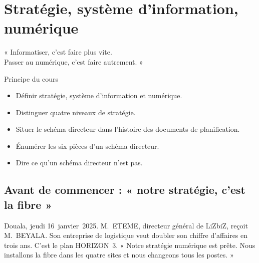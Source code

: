 
\chapter{Stratégie, système d'information, numérique}
\label{chap:vocabulaire}

\epigraph{%
    « Informatiser, c'est faire plus vite.\\
    Passer au numérique, c'est faire autrement. »%
}{Principe du cours}


\begin{boxobjectifs}
\begin{itemize}
    \item Définir stratégie, système d'information et numérique.
    \item Distinguer quatre niveaux de stratégie.
    \item Situer le schéma directeur dans l'histoire des documents de planification.
    \item Énumérer les six pièces d'un schéma directeur.
    \item Dire ce qu'un schéma directeur n'est pas.
\end{itemize}
\end{boxobjectifs}

\bigskip

\section*{Avant de commencer : « notre stratégie, c'est la fibre »}

Douala, jeudi 16~janvier~2025. M.~ETEME, directeur général de LiZbiZ, reçoit M.~BEYALA. Son entreprise de
logistique veut doubler son chiffre d'affaires en trois ans. C'est le plan HORIZON~3. « Notre stratégie
numérique est prête. Nous installons la fibre dans les quatre sites et nous changeons tous les postes. »

